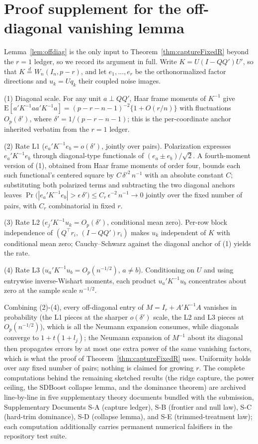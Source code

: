 \documentclass[11pt]{article}
\theoremstyle{definition}
\theoremstyle{remark}
\newcommand{\E}{\mathrm{E}}
\begin{document}
\section{Proof supplement for the off-diagonal vanishing lemma}\label{app:offdiag}

Lemma~\ref{lem:offdiag} is the only input to Theorem~\ref{thm:captureFixedR} beyond the $r=1$ ledger, so we record its argument in full. Write $K=U(I-QQ')U'$, so that $K\stackrel{d}{=}W_n(I_n,p-r)$, and let $e_1,\dots,e_r$ be the orthonormalized factor directions and $u_k=Uq_k$ their coupled noise images.

\noindent(1) Diagonal scale. For any unit $a\perp QQ'$, Haar frame moments of $K^{-1}$ give $\E[a'K^{-1}aa'K^{-1}a]=(p-r-n-1)^{-2}\{1+O(r/n)\}$ with fluctuations $O_p(\delta')$, where $\delta'=1/(p-r-n-1)$; this is the per-coordinate anchor inherited verbatim from the $r=1$ ledger.

\noindent(2) Rate L1 ($e_a'K^{-1}e_b=o(\delta')$, jointly over pairs). Polarization expresses $e_a'K^{-1}e_b$ through diagonal-type functionals of $(e_a\pm e_b)/\sqrt2$. A fourth-moment version of (1), obtained from Haar frame moments of order four, bounds each such functional's centered square by $C\,\delta'^2\,n^{-1}$ with an absolute constant $C$; substituting both polarized terms and subtracting the two diagonal anchors leaves
$\Pr\bigl(|e_a'K^{-1}e_b|>\epsilon\,\delta'\bigr)\le C_r\,\epsilon^{-2}\,n^{-1}\to0$
jointly over the fixed number of pairs, with $C_r$ combinatorial in fixed $r$.

\noindent(3) Rate L2 ($e_j'K^{-1}u_k=O_p(\delta')$, conditional mean zero). Per-row block independence of $(Q^\top r_i,\,(I-QQ')r_i)$ makes $u_k$ independent of $K$ with conditional mean zero; Cauchy--Schwarz against the diagonal anchor of (1) yields the rate.

\noindent(4) Rate L3 ($u_a'K^{-1}u_b=O_p(n^{-1/2})$, $a\ne b$). Conditioning on $U$ and using entrywise inverse-Wishart moments, each product $u_a'K^{-1}u_b$ concentrates about zero at the sample scale $n^{-1/2}$.

Combining (2)-(4), every off-diagonal entry of $M=I_r+A'K^{-1}A$ vanishes in probability (the L1 pieces at the sharper $o(\delta')$ scale, the L2 and L3 pieces at $O_p(n^{-1/2})$), which is all the Neumann expansion consumes, while diagonals converge to $1+t(1+l_j)$; the Neumann expansion of $M^{-1}$ about its diagonal then propagates errors by at most one extra power of the same vanishing factors, which is what the proof of Theorem~\ref{thm:captureFixedR} uses. Uniformity holds over any fixed number of pairs; nothing is claimed for growing $r$. The complete computations behind the remaining sketched results (the ridge capture, the power ceiling, the SDBoost collapse lemma, and the dominance theorem) are archived line-by-line in five supplementary theory documents bundled with the submission, Supplementary Documents S-A (capture ledger), S-B (frontier and null law), S-C (hard-trim dominance), S-D (collapse lemma), and S-E (trimmed-treatment law); each computation additionally carries permanent numerical falsifiers in the repository test suite.
\end{document}
